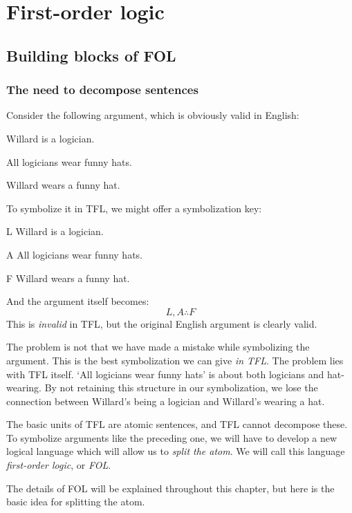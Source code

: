 \part{First-order logic}
\label{ch.FOL}
\chapter{Building blocks of FOL}\label{s:FOLBuildingBlocks}

\section{The need to decompose sentences}
Consider the following argument, which is obviously valid in English:
\begin{earg}
\label{willard1}
\item Willard is a logician. 
\item All logicians wear funny hats. 
\item[\therefore] Willard wears a funny hat.
\end{earg}
To symbolize it in TFL, we might offer a symbolization key:
\begin{ekey}
\item[L] Willard is a logician.
\item[A] All logicians wear funny hats.
\item[F] Willard wears a funny hat.
\end{ekey}
And the argument itself becomes:
$$L, A \therefore F$$
This is \emph{invalid} in TFL, but the original English argument is clearly valid.

The problem is not that we have made a mistake while symbolizing the argument. This is the best symbolization we can give \emph{in TFL}. The problem lies with TFL itself. `All logicians wear funny hats' is about both logicians and hat-wearing. By not retaining this structure in our symbolization, we lose the connection between Willard's being a logician and Willard's wearing a hat.

The basic units of TFL are atomic sentences, and TFL cannot decompose these. To symbolize arguments like the preceding one, we will have to develop a new logical language which will allow us to \emph{split the atom}. We will call this language \emph{first-order logic}, or \emph{FOL}. 

The details of FOL will be explained throughout this chapter, but here is the basic idea for splitting the atom.


